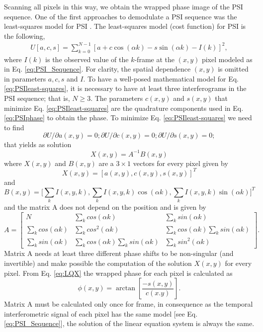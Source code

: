 Scanning all pixels in this way, we obtain the wrapped phase image of
the PSI sequence. One of the first approaches to demodulate a PSI
sequence was the least-squares model for PSI
\cite{Morgan,Greivenkamp,Okada,Kong}. The least-squares model (cost function) 
for PSI is the following,
\begin{align}\label{eq:PSIleast-squares}
  U[a,c,s]= \sum_{k=0}^{N-1}\left[a + c \cos(\alpha k)\right.
  -\left. s \sin(\alpha k)-I(k) \right]^2,
\end{align}
where $I(k)$ is the observed value of the $k$-frame at the
$(x,y)$ pixel modeled as in Eq. \eqref{eq:PSI_Sequence}. For clarity, 
the spatial dependence $(x,y)$ is omitted in parameters $a,c,s$ and $I$.
To have a well-posed mathematical model for Eq. \eqref{eq:PSIleast-squares},
it is necessary to have at least three interferograms in the PSI sequence;
that is, $N\geq 3$. The parameters $c(x,y)$ and $s(x,y)$ that minimize Eq. 
\eqref{eq:PSIleast-squares} are the quadrature components used in Eq. 
\eqref{eq:PSIphase} to obtain the phase. To minimize Eq. 
\eqref{eq:PSIleast-squares} we need to find
\begin{equation}
 \partial U/ \partial a(x,y)=0; \partial U/ \partial c(x,y)=0; 
\partial U/ \partial s(x,y)=0;
\end{equation}
that yields as solution
\begin{equation}
 X(x,y)=A^{-1}B(x,y)
\end{equation}
where $X(x,y)$ and $B(x,y)$ are a $3 \times 1$ vectors for every pixel given by
\begin{equation}\label{eq:LQX}
 X(x,y)=[a(x,y),c(x,y),s(x,y)]^T
\end{equation}
and
\begin{equation}
 B(x,y)=\bigg[\sum_k I(x,y,k),\sum_k I(x,y,k) \cos(\alpha k),
 \sum_k I(x,y,k) \sin(\alpha k) \bigg]^T
\end{equation}
and the matrix A does not depend on the position and is given by
\begin{equation}
A=\left[\begin{array}{ccc}
N & \sum_{k}cos(\alpha k) & \sum_{k}sin(\alpha k)\\
\sum_{k}cos(\alpha k) & \sum_{k}cos^{2}(\alpha k) & \sum_{k}cos(\alpha k)
\sum_{k}sin(\alpha k)\\
\sum_{k}sin(\alpha k) & \sum_{k}cos(\alpha k)\sum_{k}sin(\alpha k) & 
\sum_{k}sin^{2}(\alpha k)\end{array}\right].
\end{equation}
Matrix A needs at least three different phase shifts to be non-singular (and 
invertible) and make possible the computation of the solution $X(x,y)$ for every
pixel. From Eq. \eqref{eq:LQX} the wrapped phase for each pixel is calculated as
\begin{equation}
 \phi(x,y)=\arctan\left[\frac{-s(x,y)}{c(x.y)} \right].
\end{equation}
Matrix A must be calculated only once for frame, in consequence as the temporal 
interferometric signal of each pixel has the same model 
[see Eq. \eqref{eq:PSI_Sequence}], the solution of the linear equation system is 
always the same.


